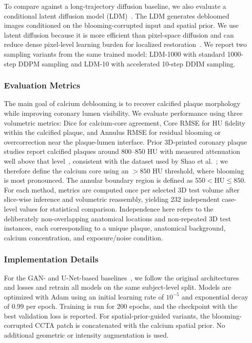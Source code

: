 \documentclass[singleLetter,times]{sagej}
\begin{document}
To compare against a long-trajectory diffusion baseline, we also evaluate a conditional latent diffusion model (LDM)~\cite{rombach2022highresolution}. The LDM generates debloomed images conditioned on the blooming-corrupted input and spatial prior. We use latent diffusion because it is more efficient than pixel-space diffusion and can reduce dense pixel-level learning burden for localized restoration~\cite{ju2024brushnet,LatentPaint}. We report two sampling variants from the same trained model: LDM-1000 with standard 1000-step DDPM sampling and LDM-10 with accelerated 10-step DDIM sampling.

\subsubsection{Evaluation Metrics}

The main goal of calcium deblooming is to recover calcified plaque morphology while improving coronary lumen visibility. We evaluate performance using three volumetric metrics: Dice for calcium-core agreement, Core RMSE for HU fidelity within the calcified plaque, and Annulus RMSE for residual blooming or overcorrection near the plaque-lumen interface. 
Prior 3D-printed coronary plaque studies report calcified plaques around 800--850 HU with measured attenuation well above that level~\cite{biom11091307}, consistent with the dataset used by Shao et al.~\cite{shao2026deblooming}; we therefore define the calcium core using an $>850$ HU threshold, where blooming is most pronounced. The annular boundary region is defined as $550<\mathrm{HU}\leq850$. 
For each method, metrics are computed once per selected 3D test volume after slice-wise inference and volumetric reassembly, yielding 232 independent case-level values for statistical comparison. Independence here refers to the deliberately non-overlapping anatomical locations and non-repeated 3D test instances, each corresponding to a unique plaque, anatomical background, calcium concentration, and exposure/noise condition.

\subsubsection{Implementation Details}
For the GAN- and U-Net-based baselines~\cite{CT_SRGAN,yi2018sharpness,ZHAO_sem,shao2026deblooming}, we follow the original architectures and losses and retrain all models on the same subject-level split. Models are optimized with Adam using an initial learning rate of $10^{-5}$ and exponential decay of 0.99 per epoch. Training is run for 200 epochs, and the checkpoint with the best validation loss is reported. For spatial-prior-guided variants, the blooming-corrupted CCTA patch is concatenated with the calcium spatial prior. No additional geometric or intensity augmentation is used.
\end{document}

